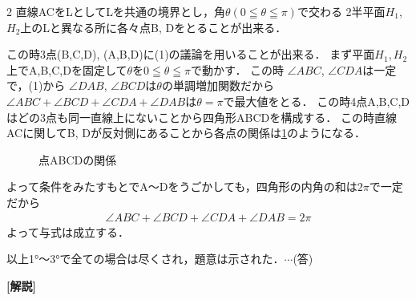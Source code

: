 \documentclass[../../main.tex]{subfiles}
\begin{document}
\begin{multicols}{2}
  直線ACをLとしてLを共通の境界とし，角$\theta(0 \leqq \theta \leqq \pi)$で交わる
  2半平面$H_1$, $H_2$上のLと異なる所に各々点B, Dをとることが出来る．

  この時$3$点(B,C,D), (A,B,D)に(1)の議論を用いることが出来る．
  まず平面$H_1,H_2$上でA,B,C,Dを固定して$\theta$を$0 \leqq \theta \leqq \pi$で動かす．
  この時
  $\angle ABC$, $\angle CDA$は一定で，(1)から
  $\angle DAB$, $\angle BCD$は$\theta$の単調増加関数だから
  $\angle ABC + \angle BCD + \angle CDA + \angle DAB$は$\theta=\pi$で最大値をとる．
  この時4点A,B,C,Dはどの3点も同一直線上にないことから四角形ABCDを構成する．
  この時直線ACに関してB, Dが反対側にあることから各点の関係は\cref{1992-2:fig:5}のようになる．

  \begin{figure}[H]
    \centering
    \caption{点ABCDの関係}
    \label{1992-2:fig:5}
  \end{figure}

  よって条件をみたすもとでA〜Dをうごかしても，四角形の内角の和は$2\pi$で一定だから
  \begin{align}
    \angle ABC + \angle BCD + \angle CDA + \angle DAB = 2\pi
  \end{align}
  よって与式は成立する．

  以上1°〜3°で全ての場合は尽くされ，題意は示された．$\cdots$(答)

  {\bf [解説]}

  \newpage
\end{multicols}
\end{document}
